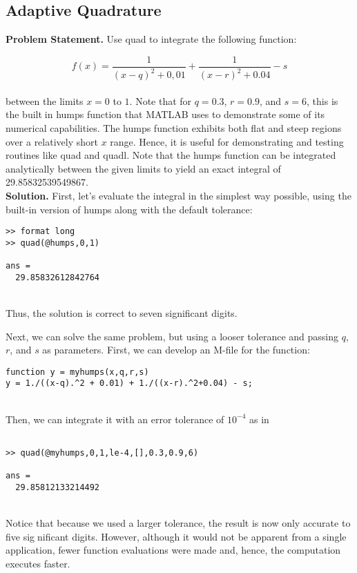 \subsection{Adaptive Quadrature}
\textbf{Problem Statement.} Use quad to integrate the following function:

	$$f(x) = \dfrac{1}{(x-q)^{2} +0,01} + \dfrac{1}{(x-r)^{2}+0.04} - s$$\\
between the limits $x = 0$ to $1$. Note that for $q = 0.3$, $r = 0.9$, and $s = 6$, this is the builtin humps function that MATLAB uses to demonstrate some of its numerical capabilities.
The humps function exhibits both flat and steep regions over a relatively short $x$ range.
Hence, it is useful for demonstrating and testing routines like quad and quadl. Note that
the humps function can be integrated analytically between the given limits to yield an exact
integral of 29.85832539549867.\\
\vspace{0.2in}
\textbf{Solution.} First, let’s evaluate the integral in the simplest way possible, using the built-in
version of humps along with the default tolerance:
\begin{verbatim}
>> format long
>> quad(@humps,0,1)

ans =
  29.85832612842764
\end{verbatim}\\
Thus, the solution is correct to seven significant digits.

Next, we can solve the same problem, but using a looser tolerance and passing $q$, $r$, and
$s$ as parameters. First, we can develop an M-file for the function:
\begin{verbatim}
function y = myhumps(x,q,r,s)
y = 1./((x-q).^2 + 0.01) + 1./((x-r).^2+0.04) - s;
\end{verbatim}\\
Then, we can integrate it with an error tolerance of $10^{−4}$ as in
\begin{verbatim}

>> quad(@myhumps,0,1,le-4,[],0.3,0.9,6)

ans =
  29.85812133214492
\end{verbatim}\\
Notice that because we used a larger tolerance, the result is now only accurate to five significant digits. However, although it would not be apparent from a single application, fewer
function evaluations were made and, hence, the computation executes faster.


\pagebreak

